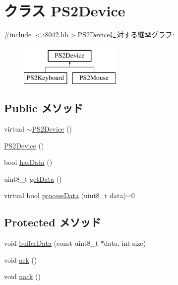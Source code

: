 \hypertarget{classX86ISA_1_1PS2Device}{
\section{クラス PS2Device}
\label{classX86ISA_1_1PS2Device}
}


{\ttfamily \#include $<$i8042.hh$>$}PS2Deviceに対する継承グラフ:\begin{figure}[H]
\begin{center}
\leavevmode
\includegraphics[height=2cm]{classX86ISA_1_1PS2Device}
\end{center}
\end{figure}
\subsection*{Public メソッド}
\begin{DoxyCompactItemize}
\item 
virtual \hyperlink{classX86ISA_1_1PS2Device_a301312a5e152ace246063d63da23028e}{$\sim$PS2Device} ()
\item 
\hyperlink{classX86ISA_1_1PS2Device_a428b97491100c33940d240972502bae7}{PS2Device} ()
\item 
bool \hyperlink{classX86ISA_1_1PS2Device_a409e05a5f45af16b718f74360a118941}{hasData} ()
\item 
uint8\_\-t \hyperlink{classX86ISA_1_1PS2Device_abe40c1e97e22c2185a0cce90fe4c04a7}{getData} ()
\item 
virtual bool \hyperlink{classX86ISA_1_1PS2Device_a7bfab1b5725d41896d0cd06793244ab7}{processData} (uint8\_\-t data)=0
\end{DoxyCompactItemize}
\subsection*{Protected メソッド}
\begin{DoxyCompactItemize}
\item 
void \hyperlink{classX86ISA_1_1PS2Device_ae2ad55fbaa638568a74bdd631bcc0757}{bufferData} (const uint8\_\-t $\ast$data, int size)
\item 
void \hyperlink{classX86ISA_1_1PS2Device_ad1d30e70693fa0b07c77697ecf181ef1}{ack} ()
\item 
void \hyperlink{classX86ISA_1_1PS2Device_add2392e874a62256159bff48d370fe4d}{nack} ()
\end{DoxyCompactItemize}
